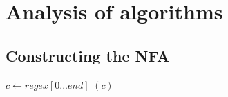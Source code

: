 \section{Analysis of algorithms}

\subsection{Constructing the NFA}


\begin{codebox}
  \li \For $c \gets regex[0...end]$
  \li \Do
  \li    {}$(c)$
  \li    {}
  \li \End
\end{codebox}
